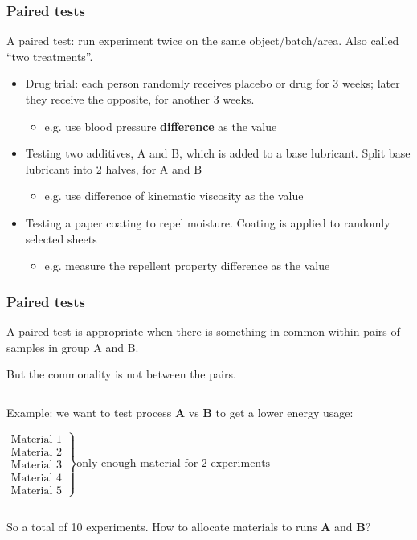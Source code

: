 \begin{frame}\frametitle{Paired tests}

	A paired test: run experiment twice on the same object/batch/area. Also called ``two treatments''.
	\begin{itemize}
		\item	Drug trial: each person randomly receives placebo or drug for 3 weeks; later they receive the opposite, for another 3 weeks.
		\begin{itemize}
			\item	e.g. use blood pressure \textbf{difference} as the value
		\end{itemize}
		\item	Testing two additives, A and B, which is added to a base lubricant. Split base lubricant into 2 halves, for A and B
		\begin{itemize}
			\item	e.g. use difference of kinematic viscosity as the value
		\end{itemize}
		\item	Testing a paper coating to repel moisture. Coating is applied to randomly selected sheets
		\begin{itemize}
			\item	e.g. measure the repellent property difference as the value
		\end{itemize}
	\end{itemize}
\end{frame}

\begin{frame}\frametitle{Paired tests}

	A paired test is appropriate when there is something in common within pairs of samples in group A and B.

	But the commonality is not between the pairs.

	$\qquad$

	Example: we want to test process \textbf{A} vs \textbf{B} to get a lower energy usage:

	$ \left.
	\begin{array}{r}
		\text{Material 1}\\
		\text{Material 2}\\
		\text{Material 3}\\
		\text{Material 4}\\
		\text{Material 5}
	\end{array}
	\right\} \text{only enough material for 2 experiments} $

	$\qquad$

	So a total of 10 experiments. How to allocate materials to runs \textbf{A} and \textbf{B}?
\end{frame}

